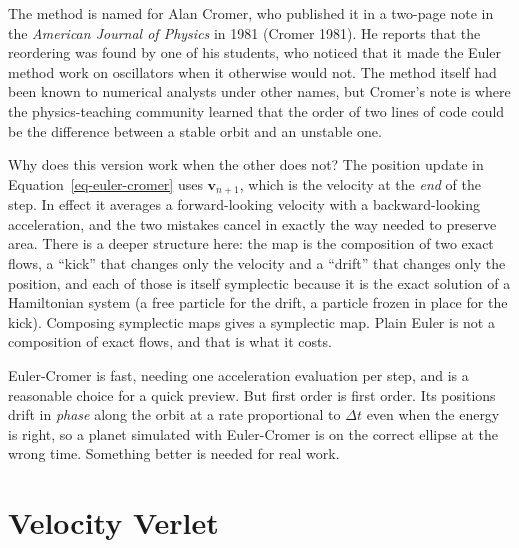 \documentclass[
  10.5pt,
  letterpaper,
]{scrbook}
\theoremstyle{plain}
\theoremstyle{remark}
\begin{document}
\begin{tcolorbox}[enhanced jigsaw, arc=.35mm, bottomrule=.15mm, bottomtitle=1mm, breakable, colback=white, colbacktitle=quarto-callout-note-color!10!white, colframe=quarto-callout-note-color-frame, coltitle=black, left=2mm, leftrule=.75mm, opacityback=0, opacitybacktitle=0.6, rightrule=.15mm, title={Where it comes from}, titlerule=0mm, toprule=.15mm, toptitle=1mm]

The method is named for Alan Cromer, who published it in a two-page note
in the \emph{American Journal of Physics} in 1981 (Cromer 1981). He
reports that the reordering was found by one of his students, who
noticed that it made the Euler method work on oscillators when it
otherwise would not. The method itself had been known to numerical
analysts under other names, but Cromer's note is where the
physics-teaching community learned that the order of two lines of code
could be the difference between a stable orbit and an unstable one.

\end{tcolorbox}

Why does this version work when the other does not? The position update
in Equation~\ref{eq-euler-cromer} uses \(\mathbf{v}_{n+1}\), which is
the velocity at the \emph{end} of the step. In effect it averages a
forward-looking velocity with a backward-looking acceleration, and the
two mistakes cancel in exactly the way needed to preserve area. There is
a deeper structure here: the map is the composition of two exact flows,
a ``kick'' that changes only the velocity and a ``drift'' that changes
only the position, and each of those is itself symplectic because it is
the exact solution of a Hamiltonian system (a free particle for the
drift, a particle frozen in place for the kick). Composing symplectic
maps gives a symplectic map. Plain Euler is not a composition of exact
flows, and that is what it costs.

Euler-Cromer is fast, needing one acceleration evaluation per step, and
is a reasonable choice for a quick preview. But first order is first
order. Its positions drift in \emph{phase} along the orbit at a rate
proportional to \(\Delta t\) even when the energy is right, so a planet
simulated with Euler-Cromer is on the correct ellipse at the wrong time.
Something better is needed for real work.

\section{Velocity Verlet}\label{velocity-verlet}
\end{document}
